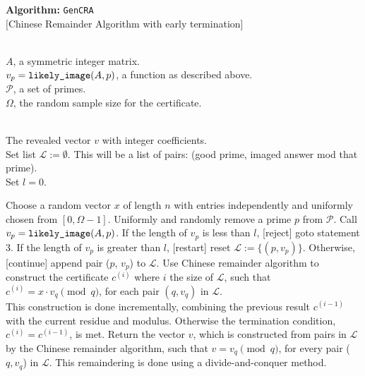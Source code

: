 \documentclass{acm_proc_article-sp}
\makeatletter
\newlength{\Stmtindent}
\newenvironment{algorithm}[1]
{
   \setlength{\Stmtindent}{10pt}
   \def\Stmt{\@ifnextchar[{\@Stmt}{\@Stmt[]}}
   \def\@Stmt[##1]{\par\hspace*{\Stmtindent}\llap{##1\enspace\hfil}%
                   \hangindent\Stmtindent\ignorespaces}
   \def\Inspec{\par\hangindent0pt\noindent%
               \rlap{\@alginheader}\gdef\@alginheader{}%
               \hangindent1.0\Stmtindent\ignorespaces}
   \def\Outspec{\par\hangindent0pt\noindent%
                \rlap{\@algoutheader}\gdef\@algoutheader{}%
                \hangindent1.0\Stmtindent\ignorespaces}
   \def\Procspec{\par\hangindent0pt\noindent%
                \rlap{\@algprocheader}\gdef\@algprocheader{}%
                \hangindent1.0\Stmtindent\ignorespaces
				}
   \def\>{\advance\hangindent\Stmtindent\hspace*{\Stmtindent}\ignorespaces}
   \def\@alginheader{Input:}
   \def\@algoutheader{Output:}
   \def\@algprocheader{Method:}

   \parindent=0pt
   \parskip=1pt

   \medbreak\par {\bf Algorithm: }{\tt #1}
}
{\smallbreak}
\newcommand{\reveal}{\ensuremath{\mbox{\tt likely\_image}}}
\newcommand{\rSize}{\ensuremath{\Omega}}
\newcommand{\set}{\ensuremath{\mathcal P}}
\newcommand{\minPrime}{\ensuremath{\beta}}
\newcommand{\length}{\ensuremath{\mathit l}}
\newcommand{\List}{\ensuremath{\mathcal L}}
\makeatother
\begin{document}
\begin{algorithm} {GenCRA}\\
$[$Chinese Remainder Algorithm with early termination] 
\Inspec\\
  $A$, a symmetric integer matrix.\\
  $v_p = \reveal(A, p)$, a function as described above.\\
  $\set$, a set of primes.\\  %
  $\rSize$, the random sample size for the certificate.

\Outspec\\
The revealed vector $v$ with integer coefficients. \\
\Stmt[1.]
Set list $\List := \emptyset$.  This will be a list of pairs: (good prime, imaged answer
 mod that prime).\\
Set $\length = 0$.

\Stmt[2.]
Choose a random vector $x$ of length $n$ with
entries independently and uniformly chosen 
from $[0, \rSize - 1]$.
\Stmt[3.]
Uniformly and randomly remove a prime $p$ from $\set$.
\Stmt[4.]
Call $v_p = \reveal(A, p)$. 
If the length of $v_p$ is less than $\length$, [reject] goto statement 3.
If the length of $v_p$ is greater than $\length$, [restart] reset $\List := \{(p, v_p)\}$.
Otherwise, [continue] append pair ($p$, $v_p$) to $\List$.
\Stmt[5.]
Use Chinese remainder algorithm to construct 
the certificate $c^{(i)}$ where $i$ the size of $\List$, such that
$c^{(i)} = x \cdot v_{q} \pmod {q}$, for each pair $(q, v_q)$ in $\List$.\\
This construction is done incrementally, combining the previous result $c^{(i-1)}$ 
with the current residue and modulus.
\Stmt[6.]
Otherwise the termination condition, $c^{(i)} = c^{(i-1)}$,
is met.
Return the vector $v$, which is
constructed from pairs in $\List$ by the Chinese remainder algorithm,
such that $v = v_q \pmod q$, for every pair ($q, v_q$) in $\List$.
This remaindering is done using a divide-and-conquer method. 
\end{algorithm}
\end{document}
